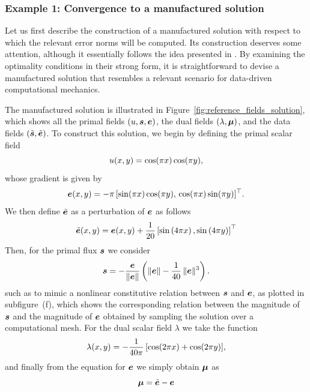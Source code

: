 \subsubsection{Example 1: Convergence to a manufactured solution}

Let us first describe the construction of a manufactured solution with respect to which the relevant error norms will be computed. Its construction deserves some attention, although it essentially follows the idea presented in \cite{ddcm1_article_gus}. By examining the optimality conditions in their strong form, it is straightforward to devise a manufactured solution that resembles a relevant scenario for data-driven computational mechanics.

The manufactured solution is illustrated in Figure~\ref{fig:reference_fields_solution}, which
shows all the primal fields $(u, \bm{s}, \bm{e})$, the dual fields $(\lambda,\bm{\mu})$, and the data fields
$(\tilde{\bm{s}},\tilde{\bm{e}})$. To construct this solution, we begin by defining the primal scalar field
\begin{equation}
 u(x,y) = \cos(\pi x)\cos(\pi y),
\end{equation}
whose gradient is given by
\begin{equation}
	\bm{e}(x,y) = -\pi \,[\sin(\pi x)\cos(\pi y),\, \cos(\pi x)\sin(\pi y)]^{\top}.
\end{equation}
We then define $\tilde{\bm{e}}$ as a perturbation of $\bm{e}$ as follows
\begin{equation}
\tilde{\bm{e}}(x,y) = \bm{e}(x,y) + \frac{1}{20} \left[\sin\left(4\pi x \right), \sin\left(4 \pi y \right) \right]^{\top}
\end{equation}
Then, for the primal flux $\bm{s}$ we consider 
\begin{equation}\label{eq:nonlinear_fluxlaw}
	\bm{s} = -\frac{\bm{e}}{\|\bm{e}\|}\left(\|\bm{e}\| - \frac{1}{40}\,\|\bm{e}\|^{3}\right).
\end{equation}
such as to mimic a nonlinear constitutive relation between $\bm{s}$ and $\bm{e}$, as plotted in subfigure~(f), which shows the corresponding relation between the magnitude of $\bm{s}$ and the magnitude of $\bm{e}$ obtained by sampling the solution over a computational mesh.
For the dual scalar field $\lambda$ we take the function
\begin{equation}
	\lambda(x,y) = -\frac{1}{40\pi}\,[\cos(2\pi x) + \cos(2\pi y)],
\end{equation}
and finally from the equation for $\bm{e}$ we simply obtain $\bm{\mu}$ as
\begin{equation}\label{eq:formu}
\bm{\mu} = \tilde{\bm{e}} - \bm{e}
\end{equation}
